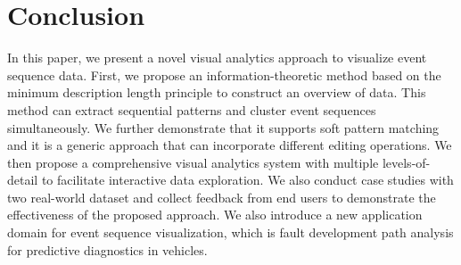 \section{Conclusion}
\label{section:conclusion}

In this paper, we present a novel visual analytics approach to visualize event sequence data. First, we propose an information-theoretic method based on the minimum description length principle to construct an overview of data. This method can extract sequential patterns and cluster event sequences simultaneously. We further demonstrate that it supports soft pattern matching and it is a generic approach that can incorporate different editing operations. We then propose a comprehensive visual analytics system with multiple levels-of-detail to facilitate interactive data exploration. We also conduct case studies with two real-world dataset and collect feedback from end users to demonstrate the effectiveness of the proposed approach. We also introduce a new application domain for event sequence visualization, which is  fault development path analysis for predictive diagnostics in vehicles. 

